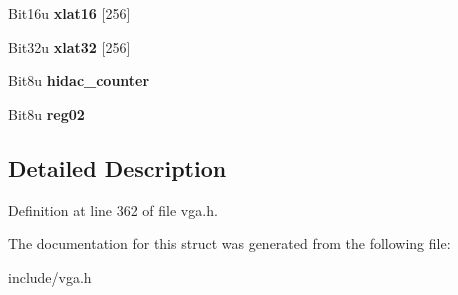 \begin{DoxyCompactItemize}
\item 
\hypertarget{structVGA__Dac_a0ecbd2205771f2bd6eeda1e799f17597}{Bit16u {\bfseries xlat16} \mbox{[}256\mbox{]}}\label{structVGA__Dac_a0ecbd2205771f2bd6eeda1e799f17597}

\item 
\hypertarget{structVGA__Dac_a9bd0942c9ea49acc3d4055ffd6115901}{Bit32u {\bfseries xlat32} \mbox{[}256\mbox{]}}\label{structVGA__Dac_a9bd0942c9ea49acc3d4055ffd6115901}

\item 
\hypertarget{structVGA__Dac_acb8aaed4d1da7f09f5875bc6d4907721}{Bit8u {\bfseries hidac\-\_\-counter}}\label{structVGA__Dac_acb8aaed4d1da7f09f5875bc6d4907721}

\item 
\hypertarget{structVGA__Dac_a5d62487fbce7e19eaeb97eb8685dd301}{Bit8u {\bfseries reg02}}\label{structVGA__Dac_a5d62487fbce7e19eaeb97eb8685dd301}

\end{DoxyCompactItemize}


\subsection{Detailed Description}


Definition at line 362 of file vga.\-h.



The documentation for this struct was generated from the following file\-:\begin{DoxyCompactItemize}
\item 
include/vga.\-h\end{DoxyCompactItemize}
